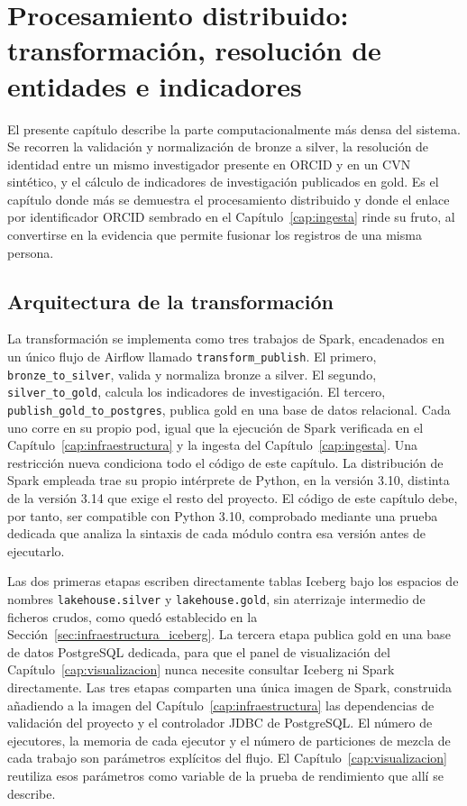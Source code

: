 \chapter{Procesamiento distribuido: transformación, resolución de entidades e indicadores}
\label{cap:procesamiento}

El presente capítulo describe la parte computacionalmente más densa del
sistema. Se recorren la validación y normalización de bronze a silver, la
resolución de identidad entre un mismo investigador presente en ORCID y en
un CVN sintético, y el cálculo de indicadores de investigación publicados
en gold. Es el capítulo donde más se demuestra el procesamiento distribuido
y donde el enlace por identificador ORCID sembrado en el
Capítulo~\ref{cap:ingesta} rinde su fruto, al convertirse en la evidencia
que permite fusionar los registros de una misma persona.

\section{Arquitectura de la transformación}
\label{sec:procesamiento_arquitectura}

La transformación se implementa como tres trabajos de Spark, encadenados
en un único flujo de Airflow llamado \texttt{transform\_publish}. El
primero, \texttt{bronze\_to\_silver}, valida y normaliza bronze a silver.
El segundo, \texttt{silver\_to\_gold}, calcula los indicadores de
investigación. El tercero, \texttt{publish\_gold\_to\_postgres}, publica
gold en una base de datos relacional. Cada uno corre en su propio pod,
igual que la ejecución de Spark verificada en el
Capítulo~\ref{cap:infraestructura} y la ingesta del
Capítulo~\ref{cap:ingesta}. Una restricción nueva condiciona todo el
código de este capítulo. La distribución de Spark empleada trae su propio
intérprete de Python, en la versión 3.10, distinta de la versión 3.14 que
exige el resto del proyecto. El código de este capítulo debe, por tanto,
ser compatible con Python 3.10, comprobado mediante una prueba dedicada
que analiza la sintaxis de cada módulo contra esa versión antes de
ejecutarlo.

Las dos primeras etapas escriben directamente tablas Iceberg bajo los
espacios de nombres \texttt{lakehouse.silver} y \texttt{lakehouse.gold},
sin aterrizaje intermedio de ficheros crudos, como quedó establecido en la
Sección~\ref{sec:infraestructura_iceberg}. La tercera etapa publica gold en
una base de datos PostgreSQL dedicada, para que el panel de visualización
del Capítulo~\ref{cap:visualizacion} nunca necesite consultar Iceberg ni
Spark directamente. Las tres etapas comparten una única imagen de Spark,
construida añadiendo a la imagen del Capítulo~\ref{cap:infraestructura}
las dependencias de validación del proyecto y el controlador JDBC de
PostgreSQL. El número de ejecutores, la memoria de cada ejecutor y el
número de particiones de mezcla de cada trabajo son parámetros explícitos
del flujo. El Capítulo~\ref{cap:visualizacion} reutiliza esos parámetros
como variable de la prueba de rendimiento que allí se describe.

